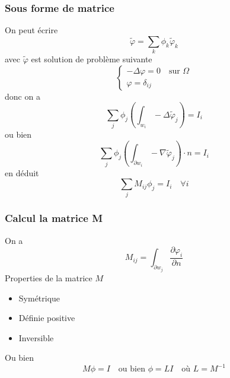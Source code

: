 \begin{frame}
\frametitle{Sous forme de matrice}
On peut \'ecrire
 \begin{equation}
   \tilde\varphi = \sum_k \phi_k \tilde{\varphi}_k
 \end{equation}
 avec $\tilde{\varphi}$ est solution de probl\`eme suivante
 \begin{equation}
   \label{eq:2}
 \begin{cases}
 -\Delta{\varphi} = 0 \quad \text{sur } \Omega \\
 {\varphi} = \delta_{ij}
 \end{cases}
 \end{equation}
 donc on a
 \begin{equation}
 \sum_j \phi_j \left( \int_{w_i}-\Delta\tilde{\varphi}_j \right) =I_i
 \end{equation}
 ou bien
 \begin{equation}
  \sum_j \phi_j \left( \int_{\partial w_i}-\nabla\tilde{\varphi}_j \right) \cdot n =I_i
 \end{equation}
 en d\'eduit
  \begin{equation}
  \sum_j M_{ij}\phi_j =I_i \quad \forall i
 \end{equation}
%


\end{frame}

 \begin{frame}
\frametitle{Calcul la matrice M}
On a
\begin{equation}
  \label{eq:3}
  M_{ij} = \int_{\partial w_j} \frac{\partial\varphi_i}{\partial n}
\end{equation}
 Properties de la matrice $M$
 \begin{itemize}
 \item Sym\'etrique
 \item D\'efinie positive
 \item Inversible
 \end{itemize}
 Ou bien
\begin{equation}
  \label{eq:4}
  M\phi =I \quad \text{ou bien } \phi =LI \quad \text{o\`u } L=M^{-1}
\end{equation}


\end{frame}

